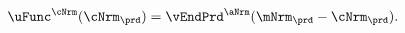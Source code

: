   \begin{equation}\begin{gathered}\begin{aligned}
        \uFunc^{\cNrm}(\cNrm_{\prd})   & = \vEndPrd^{\aNrm}(\mNrm_{\prd}-\cNrm_{\prd}).
        \label{eq:upEqbetaOp}
      \end{aligned}\end{gathered}\end{equation}
